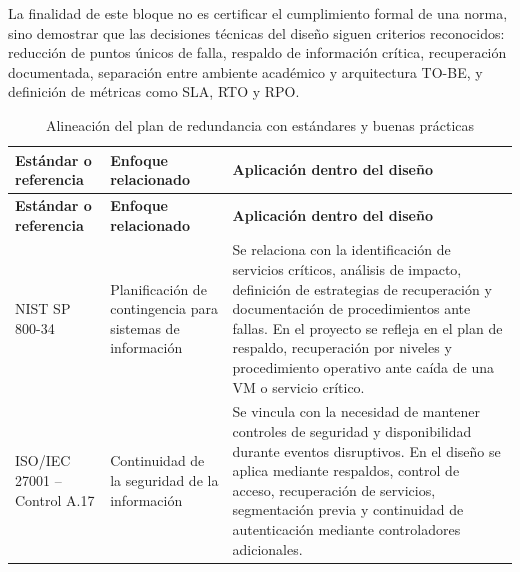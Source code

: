 \documentclass[11pt, a4paper, oneside]{report}
\begin{document}
La finalidad de este bloque no es certificar el cumplimiento formal de una norma, sino demostrar que las decisiones técnicas del diseño siguen criterios reconocidos: reducción de puntos únicos de falla, respaldo de información crítica, recuperación documentada, separación entre ambiente académico y arquitectura TO-BE, y definición de métricas como SLA, RTO y RPO.

\renewcommand{\arraystretch}{1.3}
\footnotesize
{}

\begin{xltabular}{\textwidth}{@{}|L{3.6cm}|L{4.2cm}|X|@{}}
\caption{Alineación del plan de redundancia con estándares y buenas prácticas}
\label{tab:alineacion_estandares_continuidad} \\

\parbox[c][1.1cm][c]{\linewidth}{\centering\color{white}\bfseries\small Estándar o referencia} &
\parbox[c][1.1cm][c]{\linewidth}{\centering\color{white}\bfseries\small Enfoque relacionado} &
\parbox[c][1.1cm][c]{\linewidth}{\centering\color{white}\bfseries\small Aplicación dentro del diseño} \\ \hline
\endfirsthead

\parbox[c][1.1cm][c]{\linewidth}{\centering\color{white}\bfseries\small Estándar o referencia} &
\parbox[c][1.1cm][c]{\linewidth}{\centering\color{white}\bfseries\small Enfoque relacionado} &
\parbox[c][1.1cm][c]{\linewidth}{\centering\color{white}\bfseries\small Aplicación dentro del diseño} \\ \hline
\endhead

\hline
\endfoot

{\small NIST SP 800-34} &
{\small Planificación de contingencia para sistemas de información} &
{\small Se relaciona con la identificación de servicios críticos, análisis de impacto, definición de estrategias de recuperación y documentación de procedimientos ante fallas. En el proyecto se refleja en el plan de respaldo, recuperación por niveles y procedimiento operativo ante caída de una VM o servicio crítico.} \\ \hline

{\small ISO/IEC 27001 -- Control A.17} &
{\small Continuidad de la seguridad de la información} &
{\small Se vincula con la necesidad de mantener controles de seguridad y disponibilidad durante eventos disruptivos. En el diseño se aplica mediante respaldos, control de acceso, recuperación de servicios, segmentación previa y continuidad de autenticación mediante controladores adicionales.} \\ \hline


\end{xltabular}
\end{document}
